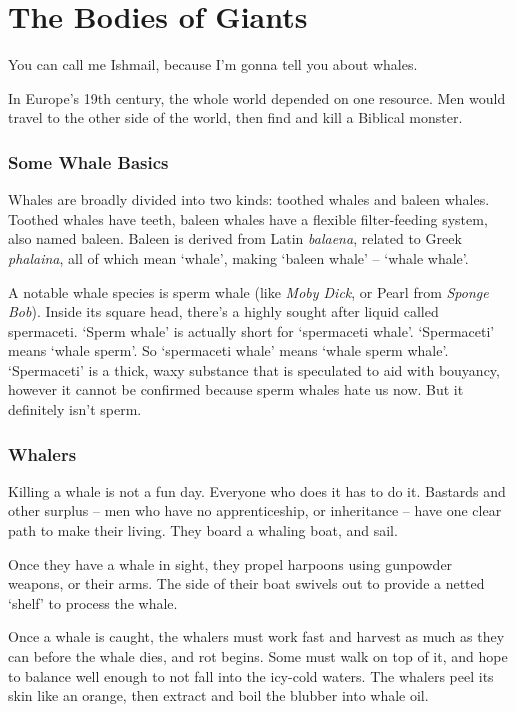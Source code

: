 \section{The Bodies of Giants}

\begin{multicols}{2}

\noindent
You can call me Ishmail, because I'm gonna tell you about whales.

In Europe's 19th century, the whole world depended on one resource.
Men would travel to the other side of the world, then find and kill a Biblical monster.

\subsubsection{Some Whale Basics}

Whales are broadly divided into two kinds: toothed whales and baleen whales.
Toothed whales have teeth, baleen whales have a flexible filter-feeding system, also named baleen.
Baleen is derived from Latin \textit{balaena}, related to Greek \textit{phalaina}, all of which mean `whale', making `baleen whale' -- `whale whale'.

A notable whale species is sperm whale (like \textit{Moby Dick}, or Pearl from \textit{Sponge Bob}).
Inside its square head, there's a highly sought after liquid called spermaceti.
`Sperm whale' is actually short for `spermaceti whale'.
`Spermaceti' means `whale sperm'.
So `spermaceti whale' means `whale sperm whale'.
`Spermaceti' is a thick, waxy substance that is speculated to aid with bouyancy, however it cannot be confirmed because sperm whales hate us now.
But it definitely isn't sperm.

\subsubsection{Whalers}

Killing a whale is not a fun day.
Everyone who does it has to do it.
Bastards and other surplus -- men who have no apprenticeship, or inheritance -- have one clear path to make their living.
They board a whaling boat, and sail.

Once they have a whale in sight, they propel harpoons using gunpowder weapons, or their arms.
The side of their boat swivels out to provide a netted `shelf' to process the whale.

Once a whale is caught, the whalers must work fast and harvest as much as they can before the whale dies, and rot begins.
Some must walk on top of it, and hope to balance well enough to not fall into the icy-cold waters.
The whalers peel its skin like an orange, then extract and boil the blubber into whale oil.


\end{multicols}

